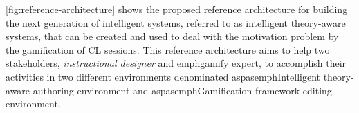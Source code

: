 
 




\autoref{fig:reference-architecture} shows the proposed reference architecture for building the next generation of
intelligent systems, referred to as intelligent theory-aware systems, that can be created and used to deal with the
motivation problem by the gamification of CL sessions. This reference architecture aims to help two stakeholders,
\emph{instructional designer} and emph{gamify expert}, to accomplish their activities in two different environments
denominated aspas{emph{Intelligent theory-aware authoring environment}} and aspas{emph{Gamification-framework editing
environment}.}

